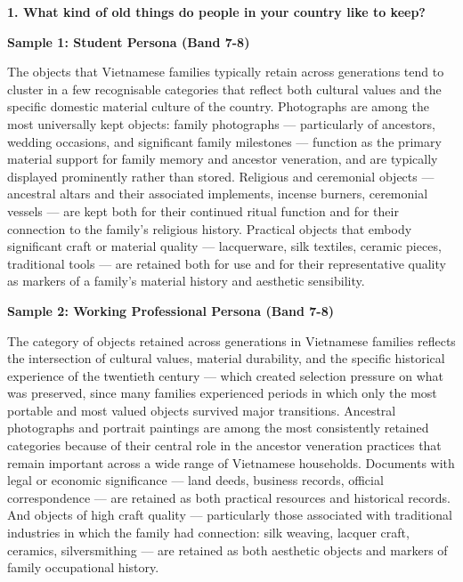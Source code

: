 \partthreeheader

\begin{ieltsquestion}
\textbf{1. What kind of old things do people in your country like to keep?}
\end{ieltsquestion}
\textbf{Sample 1: Student Persona (Band 7-8)}

The objects that Vietnamese families typically retain across generations tend to cluster in a few recognisable categories that reflect both cultural values and the specific domestic material culture of the country. Photographs are among the most universally kept objects: family photographs — particularly of ancestors, wedding occasions, and significant family milestones — function as the primary material support for family memory and ancestor veneration, and are typically displayed prominently rather than stored. Religious and ceremonial objects — ancestral altars and their associated implements, incense burners, ceremonial vessels — are kept both for their continued ritual function and for their connection to the family's religious history. Practical objects that embody significant craft or material quality — lacquerware, silk textiles, ceramic pieces, traditional tools — are retained both for use and for their representative quality as markers of a family's material history and aesthetic sensibility.

\textbf{Sample 2: Working Professional Persona (Band 7-8)}

The category of objects retained across generations in Vietnamese families reflects the intersection of cultural values, material durability, and the specific historical experience of the twentieth century — which created selection pressure on what was preserved, since many families experienced periods in which only the most portable and most valued objects survived major transitions. Ancestral photographs and portrait paintings are among the most consistently retained categories because of their central role in the ancestor veneration practices that remain important across a wide range of Vietnamese households. Documents with legal or economic significance — land deeds, business records, official correspondence — are retained as both practical resources and historical records. And objects of high craft quality — particularly those associated with traditional industries in which the family had connection: silk weaving, lacquer craft, ceramics, silversmithing — are retained as both aesthetic objects and markers of family occupational history.

